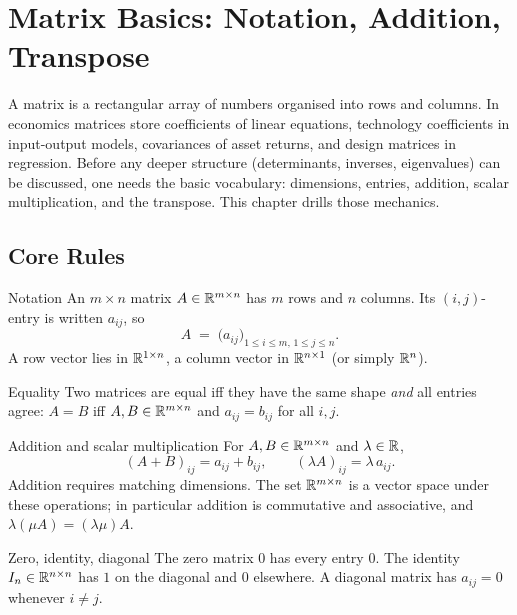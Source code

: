 \chapter{Matrix Basics: Notation, Addition, Transpose}

A matrix is a rectangular array of numbers organised into rows and columns.
In economics matrices store coefficients of linear equations, technology
coefficients in input-output models, covariances of asset returns, and design
matrices in regression. Before any deeper structure (determinants, inverses,
eigenvalues) can be discussed, one needs the basic vocabulary: dimensions,
entries, addition, scalar multiplication, and the transpose. This chapter
drills those mechanics.

\section{Core Rules}

\begin{rulebox}{Notation}
An $m \times n$ matrix $A \in \mathbb{R}^{m \times n}$ has $m$ rows and $n$ columns.
Its $(i, j)$-entry is written $a_{ij}$, so
\[
A \;=\; \bigl(a_{ij}\bigr)_{1 \le i \le m,\, 1 \le j \le n}.
\]
A row vector lies in $\mathbb{R}^{1 \times n}$, a column vector in $\mathbb{R}^{n \times 1}$
(or simply $\mathbb{R}^{n}$).
\end{rulebox}

\begin{rulebox}{Equality}
Two matrices are equal iff they have the same shape \emph{and} all entries
agree: $A = B$ iff $A, B \in \mathbb{R}^{m \times n}$ and $a_{ij} = b_{ij}$ for all
$i, j$.
\end{rulebox}

\begin{rulebox}{Addition and scalar multiplication}
For $A, B \in \mathbb{R}^{m \times n}$ and $\lambda \in \mathbb{R}$,
\[
(A + B)_{ij} = a_{ij} + b_{ij}, \qquad (\lambda A)_{ij} = \lambda \, a_{ij}.
\]
Addition requires matching dimensions. The set $\mathbb{R}^{m \times n}$ is a vector
space under these operations; in particular addition is commutative and
associative, and $\lambda(\mu A) = (\lambda \mu) A$.
\end{rulebox}

\begin{rulebox}{Zero, identity, diagonal}
The zero matrix $0$ has every entry $0$. The identity
$I_{n} \in \mathbb{R}^{n \times n}$ has $1$ on the diagonal and $0$ elsewhere. A
diagonal matrix has $a_{ij} = 0$ whenever $i \neq j$.
\end{rulebox}

